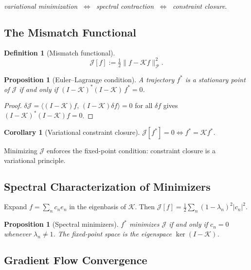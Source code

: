 \documentclass[12pt]{article}
\newtheorem{proposition}[theorem]{Proposition}
\newtheorem{corollary}[theorem]{Corollary}
\newtheorem{definition}[theorem]{Definition}
\newcommand{\Pcal}{\mathcal{P}}
\begin{document}
\begin{center}
\textit{variational minimization}
$\;\Longleftrightarrow\;$
\textit{spectral contraction}
$\;\Longleftrightarrow\;$
\textit{constraint closure}.
\end{center}

\subsection{The Mismatch Functional}

\begin{definition}[Mismatch functional]
\[
  \mathcal{J}[f] := \tfrac{1}{2}\|f - \mathcal{K}f\|^2_{\Pcal}.
\]
\end{definition}

\begin{proposition}[Euler--Lagrange condition]
\label{prop:EL}
A trajectory $f^*$ is a stationary point of $\mathcal{J}$ if and only if
$(I - \mathcal{K})^*(I - \mathcal{K})\,f^* = 0$.
\end{proposition}

\begin{proof}
$\delta\mathcal{J} = \langle (I-\mathcal{K})f,\,(I-\mathcal{K})\delta f\rangle = 0$
for all $\delta f$ gives $(I-\mathcal{K})^*(I-\mathcal{K})f = 0$.
\end{proof}

\begin{corollary}[Variational constraint closure]
$\mathcal{J}[f^*] = 0 \Longleftrightarrow f^* = \mathcal{K}f^*$.
\end{corollary}

Minimizing $\mathcal{J}$ enforces the fixed-point condition: constraint
closure is a variational principle.

\subsection{Spectral Characterization of Minimizers}

Expand $f = \sum_n c_n e_n$ in the eigenbasis of $\mathcal{K}$.
Then $\mathcal{J}[f] = \tfrac{1}{2}\sum_n(1-\lambda_n)^2|c_n|^2$.

\begin{proposition}[Spectral minimizers]
$f^*$ minimizes $\mathcal{J}$ if and only if $c_n = 0$ whenever $\lambda_n \neq 1$.
The fixed-point space is the eigenspace $\ker(I - \mathcal{K})$.
\end{proposition}

\subsection{Gradient Flow Convergence}
\end{document}
